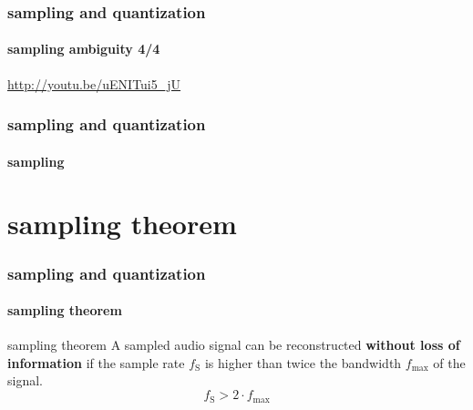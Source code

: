 		\begin{frame}\frametitle{sampling and quantization}\framesubtitle{sampling ambiguity 4/4}
			\url{http://youtu.be/uENITui5_jU}
		\end{frame}	
        
        
		\begin{frame}\frametitle{sampling and quantization}\framesubtitle{sampling}
		\end{frame}
		
	\section{sampling theorem}	
		\begin{frame}\frametitle{sampling and quantization}\framesubtitle{sampling theorem}
			\toremember{}
			\begin{block}{sampling theorem}
				\centering
				A sampled audio signal can  be reconstructed \textbf{without loss of information} if the sample rate $f_{\mathrm{S}}$ is higher than twice the bandwidth $f_{\mathrm{max}}$  of the signal.
				\begin{equation*}\label{eq:sample_theorem}	
					f_{\mathrm{S}} > 2\cdot f_{\mathrm{max}}
				\end{equation*}
			\end{block}
		\end{frame}
		
